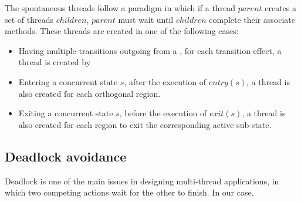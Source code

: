 The spontaneous threads follow a paradigm in which if a thread $parent$ creates a set of threads $children$, $parent$ must wait until $children$ complete their associate methods. These threads are created in one of the following cases:

\begin{itemize}
	\item Having multiple transitions outgoing from a , for each transition effect, a thread is created by 
	
	\item Entering a concurrent state $s$, after the execution of $entry(s)$, a thread is also created for each orthogonal region. 
	
	\item Exiting a concurrent state $s$, before the execution of $exit(s)$, a thread is also created for each region to exit the corresponding active sub-state. 
\end{itemize}

\subsection{Deadlock avoidance}
Deadlock is one of the main issues in designing multi-thread applications, in which two competing actions wait for the other to finish. In our case, 

